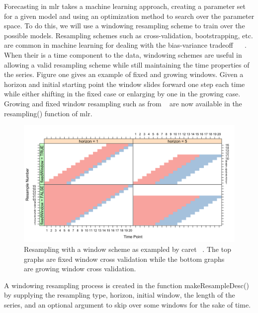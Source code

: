\documentclass{article}\usepackage[]{graphicx}\usepackage[]{color}
\makeatletter
\theoremstyle{definition}
\newcommand\code{\@codex}
\def\@codex#1{{\normalfont\ttfamily\hyphenchar\font=-1 #1}}
\newcommand{\pkg}[1]{{\fontseries{b}\selectfont #1}}
\makeatother
\begin{document}
Forecasting in \pkg{mlr} takes a machine learning approach, creating a parameter set for a given model and using an optimization method to search over the parameter space. To do this, we will use a windowing resampling scheme to train over the possible models. Resampling schemes such as cross-validation, bootstrapping, etc. are common in machine learning for dealing with the bias-variance tradeoff ~\cite{Friedman1997} ~\cite{rodriguezkfold}. When their is a time component to the data, windowing schemes are useful in allowing a valid resampling scheme while still maintaining the time properties of the series. Figure one gives an example of fixed and growing windows. Given a horizon and initial starting point the window slides forward one step each time while either shifting in the fixed case or enlarging by one in the growing case. Growing and fixed window resampling such as from ~\cite{hyndman2014forecasting} are now available in the \code{resampling()} function of \pkg{mlr}. 

\begin{figure}[ht]
\caption{Resampling with a window scheme as exampled by caret ~\cite{windowingcaret}. The top graphs are fixed window cross validation while the bottom graphs are growing window cross validation. }
  \includegraphics[scale = .23]{windowing_pic_caret}
  \centering
\end{figure}
\newpage

A windowing resampling process is created in the function \code{makeResampleDesc()} by supplying the resampling type, horizon, initial window, the length of the series, and an optional argument to skip over some windows for the sake of time.
\end{document}
